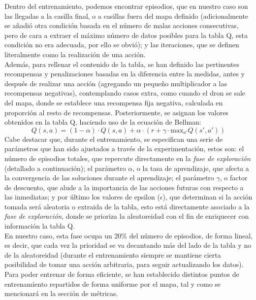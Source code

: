 Dentro del entrenamiento, podemos encontrar episodios, que en nuestro caso son las llegadas a la casilla final, o a casillas fuera del mapa definido (adicionalmente se añadió otra condición basada en el número de malas acciones consecutivas, pero de cara a extraer el máximo número de datos posibles para la tabla Q, esta condición no era adecuada, por ello se obvió); y las iteraciones, que se definen literalmente como la realización de una acción.\\

Además, para rellenar el contenido de la tabla, se han definido las pertinentes recompensas y penalizaciones basadas en la diferencia entre la medidas, antes y después de realizar una acción (agregando un pequeño multiplicador a las recompensas negativas), contemplando casos extra, como cuando el dron se sale del mapa, donde se establece una recompensa fija negativa, calculada en proporción al resto de recompensas. Posteriormente, se asignan los valores obtenidos en la tabla Q, haciendo uso de la ecuación de Bellman:
\begin{equation}
    Q(s, a) = (1 - \alpha) \cdot Q(s, a) + \alpha \cdot \left(r + \gamma \cdot \mathrm{max}_{a'} Q(s', a')\right)
\end{equation}
Cabe destacar que, durante el entrenamiento, se especifican una serie de parámetros que han sido ajustados a través de la experimentación, estos son: el número de episodios totales, que repercute directamente en la \emph{fase de exploración} (detallado a continuación); el parámetro $\alpha$, o la tasa de aprendizaje, que afecta a la convergencia de las soluciones durante el aprendizaje; el parámetro $\gamma$, o factor de descuento, que alude a la importancia de las acciones futuras con respecto a las inmediatas; y por último los valores de epsilon ($\epsilon$), que determinan si la acción tomada será aleatoria o extraida de la tabla, esto está directamente asociado a la \emph{fase de exploración}, donde se prioriza la aleatoreidad con el fin de enriquecer con información la tabla Q.\\

En nuestro caso, esta fase ocupa un 20\% del número de episodios, de forma lineal, es decir, que cada vez la prioridad se va decantando más del lado de la tabla y no de la aleatoreidad (durante el entrenamiento siempre se mantiene cierta posibilidad de tomar una acción arbitraria, para seguir actualizando los datos).\\

Para poder entrenar de forma eficiente, se han establecido distintos puntos de entrenamiento repartidos de forma uniforme por el mapa, tal y como se mencionará en la sección de métricas.\\

